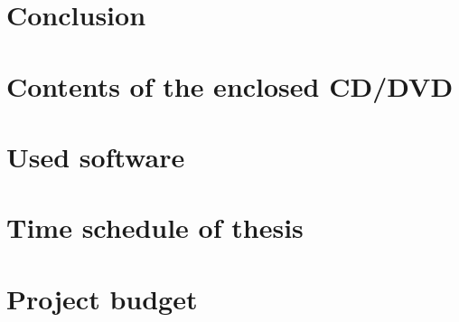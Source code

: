 \documentclass[a4paper,twoside,12pt]{book}
\renewcommand{\chaptermark}[1]{\markboth{#1}{#1}}
\begin{document}
    
\chapter{Conclusion} %
%
    
    

\clearpage  %
\printbibliography

\begin{appendices}

    \renewcommand{\chaptermark}[1]{\markboth{#1}{#1}}
    \fancyhead[L]{}


    \chapter{Contents of the enclosed CD/DVD}
    

    \chapter{Used software}
    
    
    \chapter{Time schedule of thesis}
    
    
    \chapter{Project budget}
    

\end{appendices}





\newpage %
\appendix %


\end{document}
